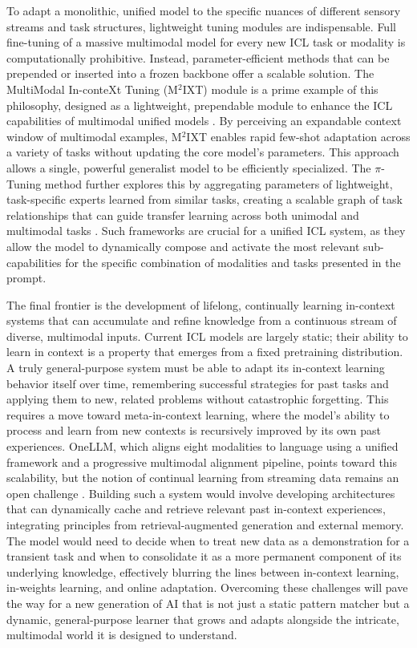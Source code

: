 \documentclass[11pt]{article}
\begin{document}
To adapt a monolithic, unified model to the specific nuances of different sensory streams and task structures, lightweight tuning modules are indispensable. Full fine-tuning of a massive multimodal model for every new ICL task or modality is computationally prohibitive. Instead, parameter-efficient methods that can be prepended or inserted into a frozen backbone offer a scalable solution. The MultiModal In-conteXt Tuning (M\(^2\)IXT) module is a prime example of this philosophy, designed as a lightweight, prependable module to enhance the ICL capabilities of multimodal unified models \cite{ref218}. By perceiving an expandable context window of multimodal examples, M\(^2\)IXT enables rapid few-shot adaptation across a variety of tasks without updating the core model's parameters. This approach allows a single, powerful generalist model to be efficiently specialized. The \(\pi\)-Tuning method further explores this by aggregating parameters of lightweight, task-specific experts learned from similar tasks, creating a scalable graph of task relationships that can guide transfer learning across both unimodal and multimodal tasks \cite{ref250}. Such frameworks are crucial for a unified ICL system, as they allow the model to dynamically compose and activate the most relevant sub-capabilities for the specific combination of modalities and tasks presented in the prompt.

The final frontier is the development of lifelong, continually learning in-context systems that can accumulate and refine knowledge from a continuous stream of diverse, multimodal inputs. Current ICL models are largely static; their ability to learn in context is a property that emerges from a fixed pretraining distribution. A truly general-purpose system must be able to adapt its in-context learning behavior itself over time, remembering successful strategies for past tasks and applying them to new, related problems without catastrophic forgetting. This requires a move toward meta-in-context learning, where the model's ability to process and learn from new contexts is recursively improved by its own past experiences. OneLLM, which aligns eight modalities to language using a unified framework and a progressive multimodal alignment pipeline, points toward this scalability, but the notion of continual learning from streaming data remains an open challenge \cite{ref644}. Building such a system would involve developing architectures that can dynamically cache and retrieve relevant past in-context experiences, integrating principles from retrieval-augmented generation and external memory. The model would need to decide when to treat new data as a demonstration for a transient task and when to consolidate it as a more permanent component of its underlying knowledge, effectively blurring the lines between in-context learning, in-weights learning, and online adaptation. Overcoming these challenges will pave the way for a new generation of AI that is not just a static pattern matcher but a dynamic, general-purpose learner that grows and adapts alongside the intricate, multimodal world it is designed to understand.
\end{document}

